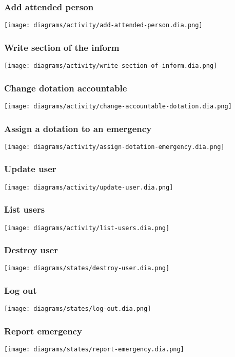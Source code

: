 \subsubsection{Add attended person}
\texttt{[image: diagrams/activity/add-attended-person.dia.png]}

\subsubsection{Write section of the inform}
\texttt{[image: diagrams/activity/write-section-of-inform.dia.png]}

\subsubsection{Change dotation accountable}
\texttt{[image: diagrams/activity/change-accountable-dotation.dia.png]}

\subsubsection{Assign a dotation to an emergency}
\texttt{[image: diagrams/activity/assign-dotation-emergency.dia.png]}

\subsubsection{Update user}
\texttt{[image: diagrams/activity/update-user.dia.png]}

\subsubsection{List users}
\texttt{[image: diagrams/activity/list-users.dia.png]}

\subsubsection{Destroy user}
\texttt{[image: diagrams/states/destroy-user.dia.png]}

\subsubsection{Log out}
\texttt{[image: diagrams/states/log-out.dia.png]}

\subsubsection{Report emergency}
\texttt{[image: diagrams/states/report-emergency.dia.png]}

